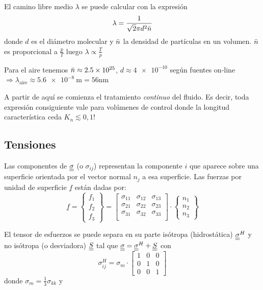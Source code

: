 El camino libre medio $\lambda$ se puede calcular con la expresión
\[
\lambda = \frac{1}{\sqrt{2} \pi d^2 \bar{n}}
\]
donde $d$ es el diámetro molecular y $\bar{n}$ la densidad de partículas en un volumen. $\bar{n}$ es proporcional a $\frac{p}{T}$ luego $\lambda \propto \frac{T}{p}$

Para el aire tenemos $\bar{n} \approx \num{2,5e25}$, $d\approx \num{4e-10}$ según fuentes on-line $\Rightarrow \lambda_{\textrm{aire}} \approx \SI{5,6e-8}{\meter}=56\si{\nano \meter}$
\begin{mdframed}
A partir de aquí se comienza el tratamiento \textit{continuo} del fluido. Es decir, toda expresión consiguiente vale para volúmenes de control donde la longitud característica ceda $K_n \lesssim 0,1$!
\end{mdframed}

\subsection{Tensiones}
Las componentes de $\underline{\underline{\sigma}}$ (o $\sigma_{ij}$) representan la componente $i$ que aparece sobre una superficie orientada por el vector normal $n_j$ a esa superficie. Las fuerzas por unidad de superficie $\underline{f}$ están dadas por:
\[
\underline{f}=
\begin{Bmatrix}
f_1 \\
f_2 \\
f_3
\end{Bmatrix} =
\begin{bmatrix}
\sigma_{11} & \sigma_{12} & \sigma_{13} \\
\sigma_{21} & \sigma_{22} & \sigma_{23} \\
\sigma_{31} & \sigma_{32} & \sigma_{33} \\
\end{bmatrix} \cdot
\begin{Bmatrix}
n_1 \\
n_2 \\
n_3
\end{Bmatrix}
\]

El tensor de esfuerzos se puede separa en su parte isótropa (hidrostática) $\underline{\underline{\sigma}}^H$ y no isótropa (o desviadora) $\underline{\underline{S}}$ tal que $\underline{\underline{\sigma}}=\underline{\underline{\sigma}}^H+\underline{\underline{S}}$ con
\[
\sigma_{ij}^H=\sigma_m \cdot \begin{bmatrix}
1 & 0 & 0 \\
0 & 1 & 0 \\
0 & 0 & 1
\end{bmatrix}
\]
donde $\sigma_m = \frac{1}{3}\sigma_{kk}$ y 

